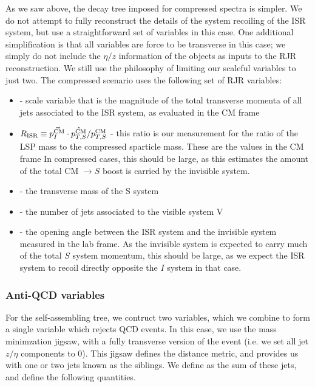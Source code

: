 As we saw above, the decay tree imposed for compressed spectra is simpler.
We do not attempt to fully reconstruct the details of the system recoiling of the ISR system, but use a straightforward set of variables in this case.
One additional simplification is that all variables are force to be transverse in this case; we simply do not include the $\eta/z$ information of the objects as inputs to the RJR reconstruction.
We still use the philosophy of limiting our scaleful variables to just two.
The compressed scenario uses the following set of RJR variables:
\begin{itemize}
\item \ptisr - scale variable that is the magnitude of the total transverse momenta of all jets associated to the ISR system, as evaluated in the CM frame
\item $R_{\text{ISR}} \equiv \vec{p_I^{\text{CM}}} \cdot \hat{p_{T,S}^{\text{CM}}} / p_{T,S}^{\text{CM}} $  - this ratio is our measurement for the ratio of the LSP mass to the compressed sparticle mass.  These are the values in the CM frame  In compressed cases, this should be large, as this estimates the amount of the total CM $\rightarrow S$ boost is carried by the invisible system.
\item \MTS - the transverse mass of the S system
\item \NVjet - the number of jets associated to the visible system V
\item \dphiISR - the opening angle between the ISR system and the invisible system measured in the lab frame.  As the invisible system is expected to carry much of the total $S$ system momentum, this should be large, as we expect the ISR system to recoil directly opposite the $I$ system in that case.
\end{itemize}

\subsubsection{Anti-QCD variables}

For the self-assembling tree, we contruct two variables, which we combine to form a single variable which rejects QCD events.
In this case, we use the mass minimzation jigsaw, with a fully transverse version of the event (i.e. we set all jet $z/\eta$ components to 0).
This jigsaw defines the distance metric, and provides us with one or two jets known as the \met siblings.
We define \psib as the sum of these jets, and define the following quantities.

